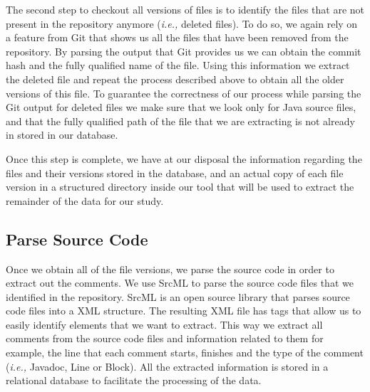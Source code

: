 The second step to checkout all versions of files is to identify the files that are not present in the repository anymore (\textit{i.e.,} deleted files). To do so, we again rely on a feature from Git that shows us all the files that have been removed from the repository. By parsing the output that Git provides us we can obtain the commit hash and the fully qualified name of the file. Using this information we extract the deleted file and repeat the process described above to obtain all the older versions of this file. To guarantee the correctness of our process while parsing the Git output for deleted files we make sure that we look only for Java source files, and that the fully qualified path of the file that we are extracting is not already in stored in our database. 

Once this step is complete, we have at our disposal the information regarding the files and their versions stored in the database, and an actual copy of each file version in a structured directory inside our tool that will be used to extract the remainder of the data for our study.

\subsection{Parse Source Code}
\label{sub:parse_source_code}

Once we obtain all of the file versions, we parse the source code in order to extract out the comments. We use SrcML \cite{Collard2013SIE} to parse the source code files that we identified in the repository. SrcML is an open source library that parses source code files into a XML structure. The resulting XML file has tags that allow us to easily identify elements that we want to extract. This way we extract all comments from the source code files and information related to them for example, the line that each comment starts, finishes and the type of the comment (\textit{i.e.,} Javadoc, Line or Block). All the extracted information is stored in a relational database to facilitate the processing of the data. 

